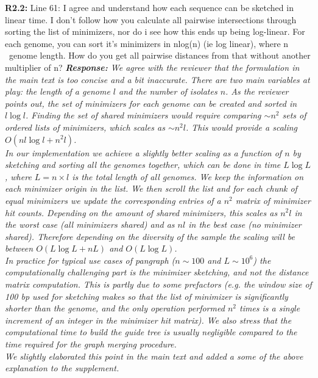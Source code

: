 \documentclass[aps,rmp,onecolumn]{revtex4-1}
\newcommand{\Marco}[1]{{\color{orange}Marco: #1}}
\newcommand{\Liam}[1]{{\color{teal}Liam: #1}}
\newcommand{\reviewer}[2]{\textbf{#1:} #2\vskip 5mm}
\newcommand{\response}[1]{{\it {\color{response}\textbf{Response:} #1}}\vskip 5mm}
\begin{document}
\reviewer{R2.2}{Line 61: I agree and understand how each sequence can be sketched in linear time. I don't follow how you calculate all pairwise intersections through sorting the list of minimizers, nor do i see how this ends up being log-linear. For each genome, you can sort it's minimizers in nlog(n) (ie log linear), where n ~genome length. How do you get all pairwise distances from that without another multiplier of n?}
\response{We agree with the reviewer that the formulation in the main text is too concise and a bit inaccurate.
      There are two main variables at play: the length of a genome $l$ and the number of isolates $n$. As the reviewer points out, the set of minimizers for each genome can be created and sorted in $l \log l$. Finding the set of shared minimizers would require comparing $\sim n^2$ sets of ordered lists of minimizers, which scales as $\sim n^2 l$. This would provide a scaling $O(n l \log l + n^2 l)$.\\
      In our implementation we achieve a slightly better scaling as a function of $n$ by sketching and sorting all the genomes together, which can be done in time $L \log L$, where $L= n \times l$ is the total length of all genomes. We keep the information on each minimizer origin in the list. We then scroll the list and for each chunk of equal minimizers we update the corresponding entries of a $n^2$ matrix of minimizer hit counts. Depending on the amount of shared minimizers, this scales as $n^2 l$ in the worst case (all minimizers shared) and as $n l$ in the best case (no minimizer shared). Therefore depending on the diversity of the sample the scaling will be between $O(L \log L + n L)$ and $O(L \log L)$.\\
      In practice for typical use cases of pangraph ($n \sim 100$ and $L \sim 10^6$) the computationally challenging part is the minimizer sketching, and not the distance matrix computation. This is partly due to some prefactors (e.g. the window size of 100 bp used for sketching makes so that the list of minimizer is significantly shorter than the genome, and the only operation performed $n^2$ times is a single increment of an integer in the minimizer hit matrix). We also stress that the computational time to build the guide tree is usually negligible compared to the time required for the graph merging procedure.\\
      We slightly elaborated this point in the main text and added a some of the above explanation to the supplement.
}
\end{document}
